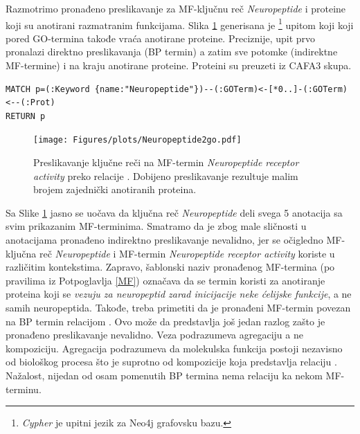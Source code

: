 Razmotrimo pronađeno preslikavanje za MF-ključnu reč \textit{Neuropeptide} i
proteine koji su anotirani razmatranim funkcijama. Slika \ref{fig:neuropeptide}
generisana je \footnote{\textit{Cypher} je upitni jezik za
Neo4j grafovsku bazu.} upitom koji koji pored GO-termina takođe vraća anotirane
proteine. Preciznije, upit prvo pronalazi direktno preslikavanja (BP termin)  a
zatim sve potomke (indirektne MF-termine) i na kraju anotirane proteine.
Proteini su preuzeti iz CAFA3 skupa. 

{ \fontsize{9}{9} 
\begin{verbatim}
MATCH p=(:Keyword {name:"Neuropeptide"})--(:GOTerm)<-[*0..]-(:GOTerm)<--(:Prot)
RETURN p
\end{verbatim}
}

\begin{figure}[!th]
\centering
\texttt{[image: Figures/plots/Neuropeptide2go.pdf]}
\caption {
  Preslikavanje ključne reči  na MF-termin
  \textit{Neuropeptide receptor activity} preko relacije .
  Dobijeno preslikavanje rezultuje malim brojem zajednički anotiranih proteina.
}
\label{fig:neuropeptide}
\end{figure}

Sa Slike \ref{fig:neuropeptide} jasno se uočava da ključna reč
\textit{Neuropeptide} deli svega 5 anotacija sa svim prikazanim MF-terminima.
Smatramo da je zbog male sličnosti u anotacijama pronađeno indirektno
preslikavanje nevalidno, jer se očigledno MF-ključna reč \textit{Neuropeptide} i
MF-termin \textit{Neuropeptide receptor activity} koriste u različitim
kontekstima. Zapravo, šablonski naziv pronađenog MF-termina (po pravilima iz
Potpoglavlja \ref{MF}) označava da se termin koristi za anotiranje proteina
koji se \textit{vezuju za neuropeptid zarad inicijacije neke ćelijske
funkcije}, a ne samih neuropeptida. Takođe, treba primetiti da je pronađeni MF-termin povezan na BP termin relacijom .  Ovo može da
predstavlja još jedan razlog zašto je pronađeno preslikavanje nevalidno.  Veza
 podrazumeva agregaciju a ne kompoziciju. Agregacija
podrazumeva da  molekulska funkcija postoji nezavisno od biološkog procesa što
je suprotno od kompozicije koja predstavlja relaciju . Nažalost,
nijedan od osam pomenutih BP termina nema relaciju  ka nekom MF-terminu.

\clearpage

